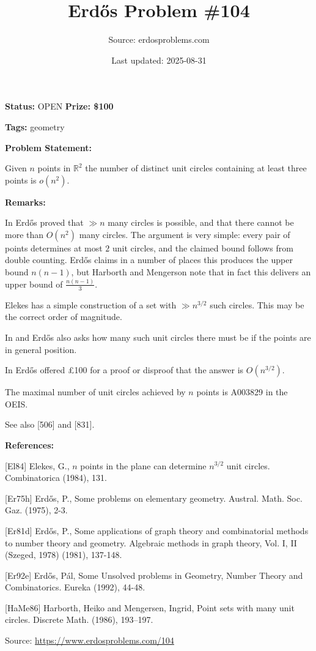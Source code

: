 \documentclass{article}
\title{Erd\H{o}s Problem \#104}
\date{Last updated: 2025-08-31}
\author{Source: erdosproblems.com}
\begin{document}
\maketitle

\noindent\textbf{Status:} OPEN \quad \textbf{Prize: \$100}

\noindent\textbf{Tags:} geometry

\medskip
\noindent\textbf{Problem Statement:}

Given $n$ points in $\mathbb{R}^2$ the number of distinct unit circles containing at least three points is $o(n^2)$.

\bigskip
\noindent\textbf{Remarks:}

In \cite{Er81d} Erd\H{o}s proved that $\gg n$ many circles is possible, and that there cannot be more than $O(n^2)$ many circles. The argument is very simple: every pair of points determines at most $2$ unit circles, and the claimed bound follows from double counting. Erd\H{o}s claims in a number of places this produces the upper bound $n(n-1)$, but Harborth and Mengerson \cite{HaMe86} note that in fact this delivers an upper bound of $\frac{n(n-1)}{3}$. 

Elekes \cite{El84} has a simple construction of a set with $\gg n^{3/2}$ such circles. This may be the correct order of magnitude.

In \cite{Er75h} and \cite{Er92e} Erd\H{o}s also asks how many such unit circles there must be if the points are in general position.

In \cite{Er92e} Erd\H{o}s offered £100 for a proof or disproof that the answer is $O(n^{3/2})$.

The maximal number of unit circles achieved by $n$ points is A003829 in the OEIS.

See also [506] and [831].

\bigskip
\noindent\textbf{References:}

[El84] Elekes, G., {$n$} points in the plane can determine $n^{3/2}$ unit
circles. Combinatorica (1984), 131.
 
 [Er75h] Erd\H{o}s, P., Some problems on elementary geometry. Austral. Math. Soc. Gaz. (1975), 2-3.
 
 [Er81d] Erd\H{o}s, P., Some applications of graph theory and combinatorial methods to number theory and geometry. Algebraic methods in graph theory, Vol. I, II (Szeged, 1978) (1981), 137-148.
 
 [Er92e] Erd\H{o}s, P\'{a}l, Some Unsolved problems in Geometry, Number Theory and Combinatorics. Eureka (1992), 44-48.
 
 [HaMe86] Harborth, Heiko and Mengersen, Ingrid, Point sets with many unit circles. Discrete Math. (1986), 193--197.

\bigskip
\noindent\small{Source: \url{https://www.erdosproblems.com/104}}
\end{document}
